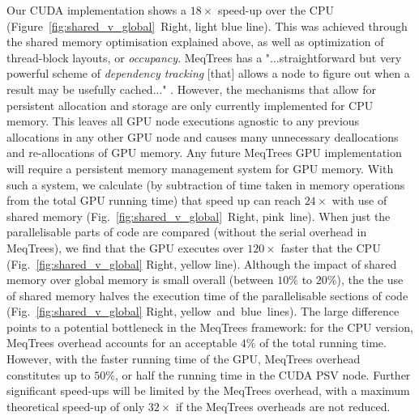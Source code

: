 Our CUDA implementation shows a $18\times$ speed-up over the CPU (Figure~\ref{fig:shared_v_global}~Right, light blue line). This was achieved through the shared memory optimisation explained above, as well as optimization of  thread-block layouts, or \emph{occupancy}.  MeqTrees has a "...straightforward but very powerful scheme of \emph{dependency tracking} [that] allows a node to figure out when a result may be usefully cached..." \citep{Noordam2011}. However,  the mechanisms that allow for persistent allocation and storage are only currently implemented for CPU memory. This leaves all GPU node executions agnostic to any previous allocations in any other GPU node and causes many unnecessary deallocations and re-allocations of GPU memory. Any future MeqTrees GPU implementation will require a persistent memory management system for GPU memory. With such a system, we calculate (by subtraction of time taken in memory operations from the total GPU running time) that speed up can reach $24\times$ with use of shared memory (Fig.~\ref{fig:shared_v_global}~Right, pink~line). When just the parallelisable parts of code are compared (without the serial overhead in MeqTrees), we find that the GPU executes over $120\times$ faster that the CPU (Fig.~\ref{fig:shared_v_global} Right, yellow line). Although the impact of shared memory over global memory is small overall (between $10\%$ to $20\%$), the the use of shared memory halves the execution time of the parallelisable sections of code (Fig.~\ref{fig:shared_v_global} Right, yellow~and~blue~lines). The large difference points to a potential bottleneck in the MeqTrees framework: for the CPU version, MeqTrees overhead accounts for an acceptable $4\%$ of the total running time. However, with the faster running time of the GPU, MeqTrees overhead constitutes up to $50\%$, or half the running time in the CUDA PSV node. Further significant speed-ups will be limited by the MeqTrees overhead, with a maximum theoretical speed-up of only $32\times$ if the MeqTrees overheads are not reduced.

